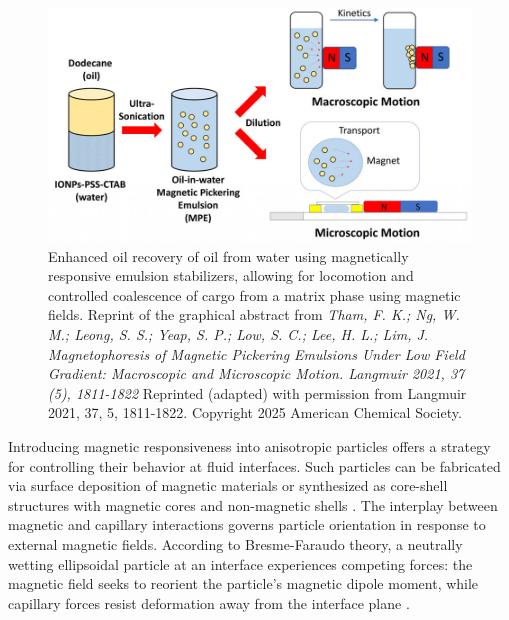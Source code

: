 \begin{figure}
    \centering
    \includegraphics[scale = 1.5]{figures/introduction/magnetophoresis_emulsion.jpeg}
    \caption{Enhanced oil recovery of oil from water using magnetically responsive emulsion stabilizers, allowing for 
             locomotion and controlled coalescence of cargo from a matrix phase using magnetic fields. Reprint of the graphical abstract from
             \textit{Tham, F. K.; Ng, W. M.; Leong, S. S.; Yeap, S. P.; Low, S. C.; Lee, H. L.; Lim, J. Magnetophoresis of Magnetic Pickering Emulsions Under Low Field Gradient: Macroscopic and Microscopic Motion. Langmuir 2021, 37 (5), 1811-1822}
             Reprinted (adapted) with permission from Langmuir 2021, 37, 5, 1811-1822. Copyright 2025 American Chemical Society.}
    \label{fig:magnetophoresis_droplet}
\end{figure}

Introducing magnetic responsiveness into anisotropic particles offers a strategy for controlling their behavior at fluid interfaces. Such particles can be fabricated via surface deposition of 
magnetic materials or synthesized as core-shell structures with magnetic cores and non-magnetic shells \cite{fei_magneto-capillary_2020, nakayama_stimuli-responsive_2018}. The interplay between 
magnetic and capillary interactions governs particle orientation in response to external magnetic fields. According to Bresme-Faraudo theory, a neutrally wetting ellipsoidal particle at an 
interface experiences competing forces: the magnetic field seeks to reorient the particle's magnetic dipole moment, while capillary forces resist deformation away from the interface plane 
\cite{bresme_orientational_2007, davies_interface_2014}.


